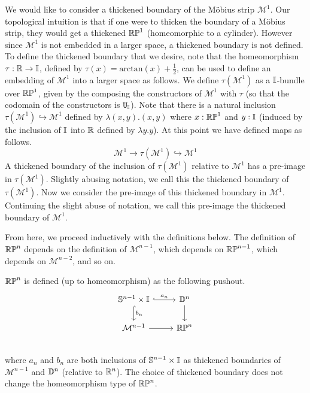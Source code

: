 \documentclass{amsart}
\begin{document}
We would like to consider a thickened boundary of the M\"{o}bius strip $\mathcal{M}^1$. Our topological intuition is that if one were to thicken the boundary of a M\"{o}bius strip, they would get a thickened $\mathbb{RP}^1$ (homeomorphic to a cylinder). However since $\mathcal{M}^1$ is not embedded in a larger space, a thickened boundary is not defined. To define the thickened boundary that we desire, note that the homeomorphism $\tau: \mathbb{R} \rightarrow \mathbb{I}$, defined by $\tau (x)=\text{arctan}(x)+ \frac{1}{2}$, can be used to define an embedding of $\mathcal{M}^1$ into a larger space as follows. We define $\tau(\mathcal{M}^1)$ as a $\mathbb{I}$-bundle over $\mathbb{RP}^1$, given by the composing the constructors of  $\mathcal{M}^1$ with $\tau$ (so that the codomain of the constructors is $\mathtt{U}_{\mathbb{I}}$).  Note that there is a natural inclusion $\tau(\mathcal{M}^1) \hookrightarrow \mathcal{M}^1$ defined by $\lambda (x, y). (x,y)$ where $x: \mathbb{RP}^1$ and $y : \mathbb{I}$ (induced by the inclusion of $\mathbb{I}$ into $\mathbb{R}$ defined by $\lambda y. y$). At this point we have defined maps as follows.
\[
\mathcal{M}^1 \rightarrow \tau(\mathcal{M}^1) \hookrightarrow \mathcal{M}^1
\]
A thickened boundary of the inclusion of $\tau(\mathcal{M}^1)$ relative to $\mathcal{M}^1$ has a pre-image in $\tau(\mathcal{M}^1)$. Slightly abusing notation, we call this the thickened boundary of $\tau(\mathcal{M}^1)$. Now we consider the pre-image of this thickened boundary in $\mathcal{M}^1$. Continuing the slight abuse of notation, we call this pre-image the thickened boundary of $\mathcal{M}^1$. 

From here, we proceed inductively with the definitions below. The definition of $\mathbb{RP}^n$ depends on the definition of $\mathcal{M}^{n-1}$, which depends on $\mathbb{RP}^{n-1}$, which depends on $\mathcal{M}^{n-2}$, and so on.

\begin{definition} $\mathbb{RP}^n$ is defined (up to homeomorphism) as the following pushout.\\
\[\begin{tikzcd}
\set{S}^{n-1} \times \set{I} \arrow[r, hook, "a_n"] \arrow[d, hook, "b_n" ] &\set{D}^{n} \arrow[d]\\
\mathcal{M}^{n-1} \arrow[r] &\set{RP}^n\\
\end{tikzcd}
\] where $a_n$ and $b_n$ are both inclusions of $\mathbb{S}^{n-1} \times \mathbb{I} $ as thickened boundaries of $\mathcal{M}^{n-1}$ and $\mathbb{D}^{n}$ (relative to $\mathbb{R}^n$). The choice of thickened boundary does not change the homeomorphism type of $\mathbb{RP}^n$.
\end{definition}
\end{document}
